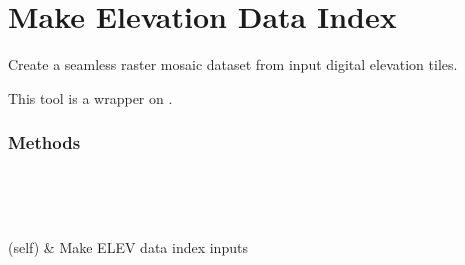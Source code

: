\documentclass[letterpaper,10pt,english]{sphinxmanual}
\begin{document}
\section{Make Elevation Data Index}
\label{\detokenize{StreamStats_DataPrep:make-elevation-data-index}}

\begin{fulllineitems}
\label{\detokenize{StreamStats_DataPrep:StreamStats_DataPrep.makeELEVDATAIndex}}
Create a seamless raster mosaic dataset from input digital elevation tiles.

This tool is a wrapper on {\hyperref[\detokenize{elevationTools:elevationTools.elevIndex}]{}}.
\subsubsection*{Methods}


\begin{savenotes}\sphinxatlongtablestart\begin{longtable}{}
\hline

\endfirsthead

%
{}\\
\hline

\endhead

\hline
{}\\
\endfoot

\endlastfoot

{\hyperref[\detokenize{StreamStats_DataPrep:StreamStats_DataPrep.makeELEVDATAIndex.getParameterInfo}]{}}(self)
&
Make ELEV data index inputs
\\
\hline
\end{longtable}\sphinxatlongtableend\end{savenotes}


\end{fulllineitems}
\end{document}
